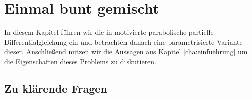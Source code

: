 
\chapter{Einmal bunt gemischt}

In diesem Kapitel führen wir die in \cite{Stasiak:2011ba} motivierte parabolische partielle Differentialgleichung ein und betrachten danach eine parametrisierte Variante dieser.
Anschließend nutzen wir die Aussagen aus Kapitel \ref{cha:einfuehrung} um die Eigenschaften dieses Problems zu diskutieren.

\section*{Zu klärende Fragen} %
\label{sub:zu_kl_rende_fragen}

